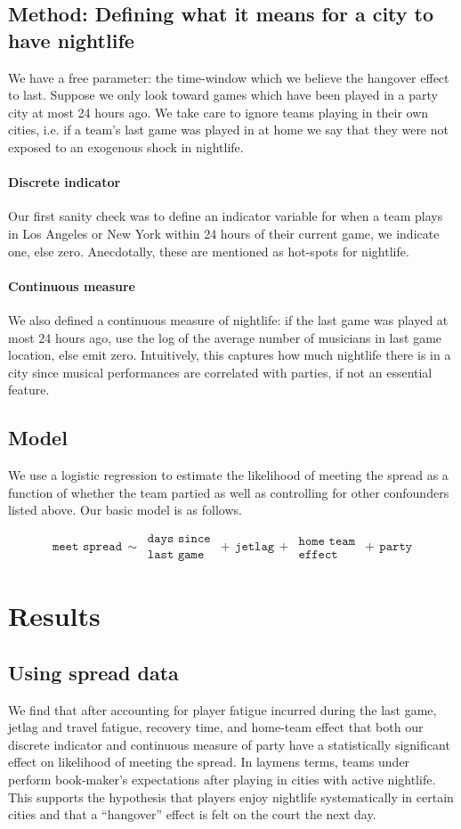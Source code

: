 \documentclass[letterpaper,12pt]{article}
\begin{document}
\subsection{Method: Defining what it means for a city to have nightlife}
We have a free parameter: the time-window which we believe the hangover effect
to last. Suppose we only look toward games which have been played in a party
city at most 24 hours ago. We take care to ignore
teams playing in their own cities, i.e. if a team's last game was played in at home 
we say that they were not exposed to an exogenous shock in nightlife.

\paragraph{Discrete indicator}
Our first sanity check was to define an indicator variable for when a team plays in 
Los Angeles or New York within 24 hours of their current game, we indicate one, else zero. Anecdotally, these are mentioned as hot-spots for
nightlife.

\paragraph{Continuous measure}
We also defined a continuous measure of nightlife:
if the last game was played at most 24 hours ago, use the log of the average number
of musicians in last game location, else emit zero. Intuitively, this captures
how much nightlife there is in a city since musical performances are correlated
with parties, if not an essential feature.

\subsection{Model} We use a logistic regression to estimate the likelihood of meeting
the spread as a function of whether the team partied as well as controlling for other confounders
listed above. Our basic model is as follows.

\[
\texttt{meet spread} \,  \sim \, \substack{\texttt{days since} \\ \texttt{last game}} \, + \, \texttt{jetlag} \, + \, \substack{\texttt{home team} \\ \texttt{effect}} \, + \, \texttt{party}
\]

\section{Results}
\subsection{Using spread data}
We find that after accounting for player fatigue incurred during the last game, jetlag and travel fatigue, recovery time, and home-team effect that both our discrete indicator and continuous measure of party
have a statistically significant effect on likelihood of meeting the spread.
In laymens terms, teams under perform book-maker's expectations after playing in cities 
with active nightlife.
This supports the hypothesis that players enjoy nightlife systematically in certain
cities and that a ``hangover'' effect is felt on the court the next day.
\end{document}
